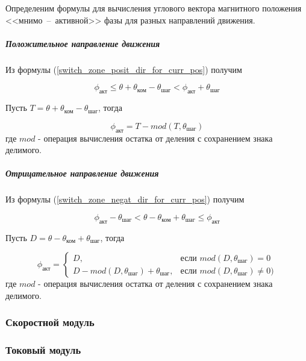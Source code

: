 Определеним формулы для вычисления углового вектора магнитного положения
<<мнимо~--~активной>> фазы для разных направлений движения.

\subparagraph{Положительное направление движения}

Из формулы (\ref{switch_zone_posit_dir_for_curr_pos}) получим

\begin{equation}
    \label{sync_restore_posit_dir_active_pole_pos_conditions}
    \phi_\textit{акт}
    \leq \theta + \theta_\textit{ком} - \theta_\textit{шаг}
    < \phi_\textit{акт} + \theta_\textit{шаг}
\end{equation}

Пусть $T = \theta + \theta_\textit{ком} - \theta_\textit{шаг}$, тогда

\begin{equation}
    \label{sync_restore_posit_dir_active_pole_pos}
    \phi_\textit{акт} = T - mod(T, \theta_\textit{шаг})
\end{equation}
где $mod$ - операция вычисления остатка от деления с сохранением знака делимого.

\subparagraph{Отрицательное направление движения}
Из формулы (\ref{switch_zone_negat_dir_for_curr_pos}) получим

\begin{equation}
    \label{sync_restore_negat_dir_active_pole_pos_conditions}
    \phi_\textit{акт} - \theta_\textit{шаг}
    < \theta - \theta_\textit{ком} + \theta_\textit{шаг}
    \leq \phi_\textit{акт}
\end{equation}

Пусть $D = \theta - \theta_\textit{ком} + \theta_\textit{шаг}$, тогда

\begin{equation}
    \label{sync_restore_negat_dir_active_pole_pos}
    \phi_\textit{акт} =
        \begin{cases}
            D,                                                      & \mbox{если } mod(D, \theta_\textit{шаг}) = 0 \\
            D - mod(D, \theta_\textit{шаг}) + \theta_\textit{шаг},  & \mbox{если } mod(D, \theta_\textit{шаг}) \ne 0)
        \end{cases}
\end{equation}
где $mod$ - операция вычисления остатка от деления с сохранением знака делимого.

\subsubsection{Скоростной модуль}
\subsubsection{Токовый модуль}

